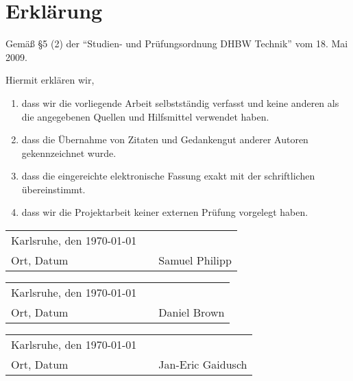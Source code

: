 \chapter*{Erklärung}
\vspace*{2em}

Gemäß \S 5 (2) der \enquote{Studien- und Prüfungsordnung DHBW Technik} vom 18.
Mai 2009.

Hiermit erklären wir,
\begin{enumerate}
\item dass wir die vorliegende Arbeit selbstständig verfasst und keine anderen als die
angegebenen Quellen und Hilfsmittel verwendet haben.
\item dass die Übernahme von Zitaten und Gedankengut anderer Autoren gekennzeichnet wurde.
\item dass die eingereichte elektronische Fassung exakt mit der schriftlichen übereinstimmt.
\item dass wir die Projektarbeit keiner externen Prüfung vorgelegt haben.
\end{enumerate}

\vspace{3em}

\begin{tabular}{lp{2em}l}
 Karlsruhe, den \today  && \hspace{7cm} \\\cline{1-1}\cline{3-3}
 Ort, Datum     &&  Samuel Philipp
\end{tabular}

\vspace{3em}

\begin{tabular}{lp{2em}l}
 Karlsruhe, den \today  && \hspace{7cm} \\\cline{1-1}\cline{3-3}
 Ort, Datum     &&  Daniel Brown
\end{tabular}

\vspace{3em}

\begin{tabular}{lp{2em}l}
 Karlsruhe, den \today  && \hspace{7cm} \\\cline{1-1}\cline{3-3}
 Ort, Datum     &&  Jan-Eric Gaidusch
\end{tabular}

